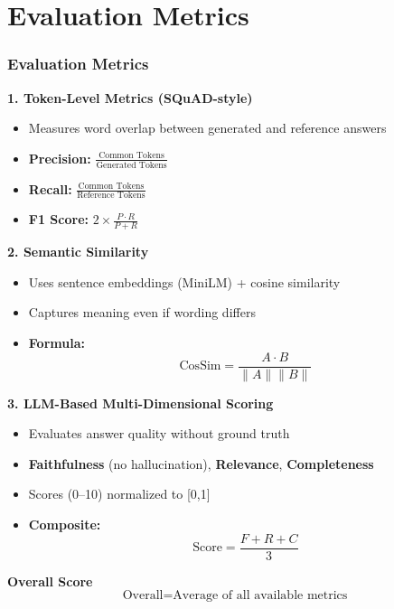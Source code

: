 \section{Evaluation Metrics}

\begin{frame}
\frametitle{Evaluation Metrics}

\small

\textbf{1. Token-Level Metrics (SQuAD-style)}
\begin{itemize}
    \item Measures word overlap between generated and reference answers
    \item \textbf{Precision:} $\frac{\text{Common Tokens}}{\text{Generated Tokens}}$
    \item \textbf{Recall:} $\frac{\text{Common Tokens}}{\text{Reference Tokens}}$
    \item \textbf{F1 Score:} $2 \times \frac{P \cdot R}{P + R}$
\end{itemize}

\vspace{0.3cm}

\textbf{2. Semantic Similarity}
\begin{itemize}
    \item Uses sentence embeddings (MiniLM) + cosine similarity
    \item Captures meaning even if wording differs
    \item \textbf{Formula:}
    \[
    \text{CosSim} = \frac{A \cdot B}{\|A\|\|B\|}
    \]
\end{itemize}

\vspace{0.3cm}

\textbf{3. \textbf{LLM}-Based Multi-Dimensional Scoring}
\begin{itemize}
    \item Evaluates answer quality without ground truth
    \item \textbf{Faithfulness} (no hallucination), \textbf{Relevance}, \textbf{Completeness}
    \item Scores (0–10) normalized to [0,1]
    \item \textbf{Composite:}
    \[
    \text{Score} = \frac{F + R + C}{3}
    \]
\end{itemize}

\vspace{0.3cm}

\textbf{Overall Score}
\[
\text{Overall} = \text{Average of all available metrics}
\]

\vspace{0.3cm}
\end{frame}